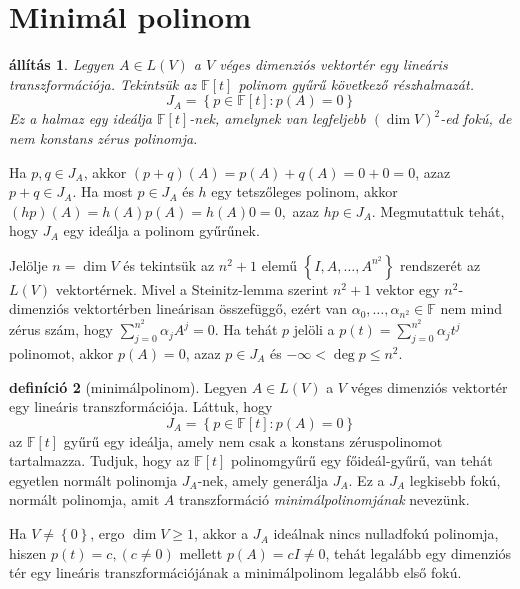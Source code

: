 \documentclass[9pt, a4paper, showtrims]{memoir}
\makeatletter
\renewenvironment{proof}[1][\proofname]
    {\par\pushQED{\qed}%
    \normalfont \topsep6\p@\@plus6\p@\relax
    \trivlist
    \item[\hskip\labelsep
        \itshape
    #1\@addpunct{:}]\ignorespaces}
    {\popQED\endtrivlist\@endpefalse}
\theoremstyle{plain}
\newtheorem{proposition}{állítás}[chapter]
\theoremstyle{remark}
\theoremstyle{definition}
\newtheorem{definition}[proposition]{definíció}
\makeatother
\begin{document}
    \section{Minimál polinom}
    \begin{proposition}
        Legyen $A\in L\left( V \right)$ a $V$ véges dimenziós vektortér egy lineáris transzformációja.
        Tekintsük az 
        $\mathbb{F}\left[ t \right]$ polinom gyűrű következő részhalmazát.
        \[
            J_{A}
            =
            \left\{ p\in\mathbb{F}\left[ t \right]:p\left( A \right)=0 \right\}
        \]
        Ez a halmaz egy ideálja $\mathbb{F}\left[ t \right]$-nek, 
        amelynek van legfeljebb $\left( \dim V \right)^2$-ed fokú, 
        de nem konstans zérus polinomja.
    \end{proposition}
    \begin{proof}
        Ha $p,q\in J_{A}$, 
        akkor 
        $\left( p+q \right)(A)=p\left( A \right)+q\left( A \right)=0+0=0$,
        azaz $p+q\in J_{A}$. 
        Ha most $p\in J_{A}$ és $h$ egy tetszőleges polinom,
        akkor 
        $
        \left( hp \right)(A)=h\left( A \right)p\left( A \right)=h\left( A \right)0=0,
        $
        azaz $hp\in J_{A}$. 
        Megmutattuk tehát, hogy $J_{A}$ egy ideálja a polinom gyűrűnek.

        Jelölje $n=\dim V$ és tekintsük az $n^2+1$ elemű
        $\left\{ I,A,\dots,A^{n^2} \right\}$ rendszerét az $L\left( V \right)$ vektortérnek.
        Mivel a Steinitz-lemma szerint  
        $n^2+1$ vektor egy $n^2$-dimenziós vektortérben lineárisan összefüggő,
        ezért van
        $\alpha_0,\dots,\alpha_{n^2}\in\mathbb{F}$ nem mind zérus szám, hogy
        $\sum_{j=0}^{n^2}\alpha_jA^j=0$.
        Ha tehát $p$ jelöli a $p\left( t \right)=\sum_{j=0}^{n^2}\alpha_jt^j$ polinomot,
        akkor
        $p\left( A \right)=0$, azaz $p\in J_{A}$ és $-\infty<\deg p\leq n^2$.
    \end{proof}
    \begin{definition}[minimálpolinom]
        Legyen $A\in L\left( V \right)$ a $V$ véges dimenziós vektortér egy lineáris transzformációja.
        Láttuk, hogy
        \[
            J_{A}
            =
            \left\{ p\in\mathbb{F}\left[ t \right]:p\left( A \right)=0 \right\}
        \]
        az $\mathbb{F}\left[ t \right]$ gyűrű egy ideálja, amely nem csak a konstans zéruspolinomot tartalmazza.
        Tudjuk, hogy az $\mathbb{F}\left[ t \right]$ polinomgyűrű egy főideál-gyűrű,
        van tehát egyetlen normált polinomja $J_{A}$-nek, amely generálja $J_{A}$.
        Ez a $J_{A}$ legkisebb fokú, normált polinomja, 
        amit $A$ transzformáció \emph{minimálpolinomjának} nevezünk.
    \end{definition}
    Ha $V\neq\left\{ 0 \right\}$, ergo $\dim V\geq 1$,
    akkor a $J_{A}$ ideálnak nincs nulladfokú polinomja, 
    hiszen $p(t)=c, (c\neq 0)$ mellett
    $p\left( A \right)=cI\neq 0$, 
    tehát legalább egy dimenziós tér egy lineáris transzformációjának a minimálpolinom legalább első fokú.
\end{document}
